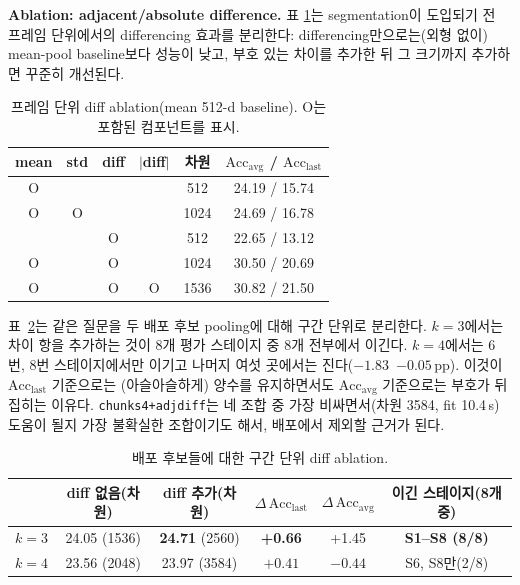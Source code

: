 \documentclass[11pt]{article}
\begin{document}
\textbf{Ablation: adjacent/absolute difference.} 표
\ref{tab:diff-frame}는 segmentation이 도입되기 전 프레임 단위에서의
differencing 효과를 분리한다: differencing만으로는(외형 없이)
mean-pool baseline보다 성능이 낮고, 부호 있는 차이를 추가한 뒤 그
크기까지 추가하면 꾸준히 개선된다.

\begin{table}[h]
\centering
\caption{프레임 단위 diff ablation(mean 512-d baseline). O는 포함된
컴포넌트를 표시.}
\label{tab:diff-frame}
\small
\begin{tabular}{@{}cccccc@{}}
\toprule
mean & std & diff & $|$diff$|$ & 차원 & $\mathrm{Acc}_{\mathrm{avg}}$ / $\mathrm{Acc}_{\mathrm{last}}$ \\
\midrule
O & & & & 512 & 24.19 / 15.74 \\
O & O & & & 1024 & 24.69 / 16.78 \\
 & & O & & 512 & 22.65 / 13.12 \\
O & & O & & 1024 & 30.50 / 20.69 \\
O & & O & O & 1536 & 30.82 / 21.50 \\
\bottomrule
\end{tabular}
\end{table}

표~\ref{tab:diff-segment}는 같은 질문을 두 배포 후보 pooling에 대해
구간 단위로 분리한다. $k{=}3$에서는 차이 항을 추가하는 것이 8개 평가
스테이지 중 8개 전부에서 이긴다. $k{=}4$에서는 6번, 8번 스테이지에서만
이기고 나머지 여섯 곳에서는 진다($-1.83$~$-0.05$\,pp). 이것이
$\mathrm{Acc}_{\mathrm{last}}$ 기준으로는 (아슬아슬하게) 양수를
유지하면서도 $\mathrm{Acc}_{\mathrm{avg}}$ 기준으로는 부호가 뒤집히는
이유다. \texttt{chunks4+adjdiff}는 네 조합 중 가장 비싸면서(차원 3584,
fit 10.4\,s) 도움이 될지 가장 불확실한 조합이기도 해서, 배포에서 제외할
근거가 된다.

\begin{table}[h]
\centering
\caption{배포 후보들에 대한 구간 단위 diff ablation.}
\label{tab:diff-segment}
\small
\begin{tabular}{@{}lccccc@{}}
\toprule
& diff 없음(차원) & diff 추가(차원) & $\Delta\,\mathrm{Acc}_{\mathrm{last}}$ & $\Delta\,\mathrm{Acc}_{\mathrm{avg}}$ & 이긴 스테이지(8개 중) \\
\midrule
$k{=}3$ & 24.05 (1536) & \textbf{24.71} (2560) & \textbf{+0.66} & +1.45 & \textbf{S1--S8 (8/8)} \\
$k{=}4$ & 23.56 (2048) & 23.97 (3584) & $+0.41$ & \textbf{$-0.44$} & S6, S8만(2/8) \\
\bottomrule
\end{tabular}
\end{table}
\end{document}
